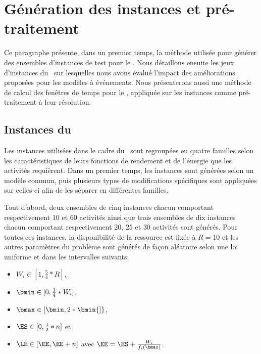 \section{Génération des instances et pré-traitement}
\label{sec:instance}
Ce paragraphe présente, dans un premier temps, la méthode utilisée
pour générer des ensembles d'instances de test pour le \CECSP. Nous
détaillons ensuite les jeux d'instances du \RCPSP~sur lesquelles nous
avons évalué l'impact des améliorations proposées pour les modèles à
événements. Nous présenterons aussi une méthode de calcul des fenêtres
de temps pour le \RCPSP, appliquée sur les instances comme
pré-traitement à leur résolution.

\subsection{Instances du \CECSP}
\label{sec:instance_CECSP}
Les instances utilisées dans le cadre du \CECSP~sont regroupées en
quatre familles selon les caractéristiques de leurs fonctions de
rendement et de l'énergie que les activités requièrent. Dans un
premier temps, les instances sont générées selon un modèle commun,
puis plusieurs types de modifications spécifiques sont appliquées sur
celles-ci afin de les séparer en différentes familles. 

Tout d'abord, deux ensembles de cinq instances chacun comportant
respectivement $10$ et $60$ activités ainsi que trois ensembles de dix
instances chacun comportant respectivement $20$, $25$ et $30$ activités sont
générés. Pour toutes ces instances, la disponibilité de la ressource
est fixée à $R=10$ et les autres paramètres du problème sont générés
de façon aléatoire selon une loi uniforme et dans les intervalles
suivants:
\begin{itemize}
\item $W_i \in [1 , \frac{5}{4} * R]$,
\item $\bmin \in [0, \frac{1}{4} * W_i]$,
\item $\bmax \in [\bmin , 2 * \bmin {]}$,
\item $\ES \in [0,\frac{1}{2}*n]$ et
\item $\LE \in [ \EE, \EE + n ]$ avec $\EE = \ES +
\frac{W_i}{f_i(\bmax)}$.
\end{itemize}

